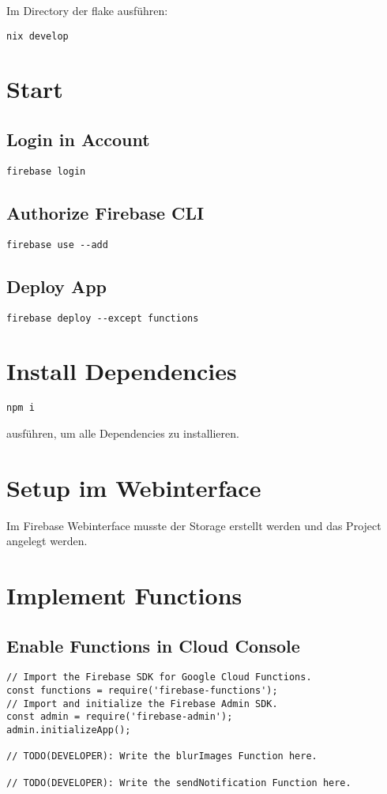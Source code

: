 Im Directory der flake ausführen:
\begin{verbatim}
nix develop
\end{verbatim}

\section{Start}

\subsection{Login in Account}
\begin{verbatim}
firebase login
\end{verbatim}

\subsection{Authorize Firebase CLI}
\begin{verbatim}
firebase use --add
\end{verbatim}

\subsection{Deploy App}
\begin{verbatim}
firebase deploy --except functions
\end{verbatim}

\section{Install Dependencies}
\begin{verbatim}
npm i
\end{verbatim}
ausführen, um alle Dependencies zu installieren.

\section{Setup im Webinterface}
Im Firebase Webinterface musste der Storage erstellt werden und das Project angelegt werden.

\section{Implement Functions}

\subsection{Enable Functions in Cloud Console}
\begin{verbatim}
// Import the Firebase SDK for Google Cloud Functions.
const functions = require('firebase-functions');
// Import and initialize the Firebase Admin SDK.
const admin = require('firebase-admin');
admin.initializeApp();

// TODO(DEVELOPER): Write the blurImages Function here.

// TODO(DEVELOPER): Write the sendNotification Function here.
\end{verbatim}

